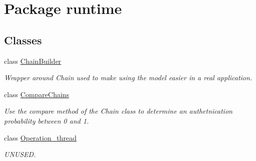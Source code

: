 \hypertarget{namespaceruntime}{}\section{Package runtime}
\label{namespaceruntime}
\subsection*{Classes}
\begin{DoxyCompactItemize}
\item 
class \hyperlink{classruntime_1_1_chain_builder}{Chain\+Builder}
\begin{DoxyCompactList}\small\item\em Wrapper around Chain used to make using the model easier in a real application. \end{DoxyCompactList}\item 
class \hyperlink{classruntime_1_1_compare_chains}{Compare\+Chains}
\begin{DoxyCompactList}\small\item\em Use the compare method of the Chain class to determine an authetnication probability between 0 and 1. \end{DoxyCompactList}\item 
class \hyperlink{classruntime_1_1_operation__thread}{Operation\+\_\+thread}
\begin{DoxyCompactList}\small\item\em U\+N\+U\+S\+ED. \end{DoxyCompactList}\end{DoxyCompactItemize}
